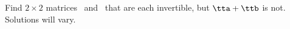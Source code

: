 {Find $2\times 2$ matrices \tta\ and \ttb\ that are each invertible, but $\tta+\ttb$ is not.}
{Solutions will vary.}